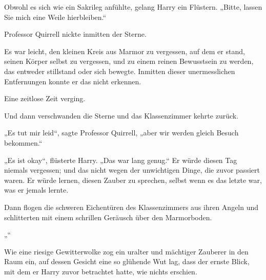 Obwohl es sich wie ein Sakrileg anfühlte, gelang Harry ein Flüstern.
„Bitte, lassen Sie mich eine Weile hierbleiben.“

Professor Quirrell nickte inmitten der Sterne.

Es war leicht, den kleinen Kreis aus Marmor zu vergessen, auf dem er stand, seinen Körper selbst zu vergessen, und zu einem reinen Bewusstsein zu werden, das entweder stillstand oder sich bewegte. Inmitten dieser unermesslichen Entfernungen konnte er das nicht erkennen.

Eine zeitlose Zeit verging.

Und dann verschwanden die Sterne und das Klassenzimmer kehrte zurück.

„Es tut mir leid“, sagte Professor Quirrell, „aber wir werden gleich Besuch bekommen.“

„Es ist okay“, flüsterte Harry.
„Das war lang genug.“ Er würde diesen Tag niemals vergessen; und das nicht wegen der unwichtigen Dinge, die zuvor passiert waren. Er würde lernen, diesen Zauber zu sprechen, selbst wenn es das letzte war, was er jemals lernte.

Dann flogen die schweren Eichentüren des Klassenzimmers aus ihren Angeln und schlitterten mit einem schrillen Geräusch über den Marmorboden.

„“

Wie eine riesige Gewitterwolke zog ein uralter und mächtiger Zauberer in den Raum ein, auf dessen Gesicht eine so glühende Wut lag, dass der ernste Blick, mit dem er Harry zuvor betrachtet hatte, wie nichts erschien.

